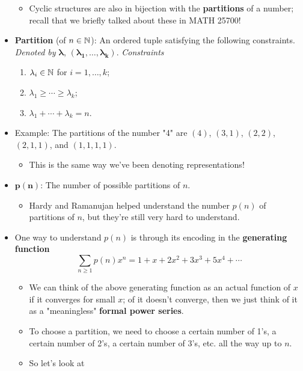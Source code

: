 \documentclass[../notes.tex]{subfiles}
\begin{document}
\begin{itemize}
\begin{itemize}
        \item Cyclic structures are also in bijection with the \textbf{partitions} of a number; recall that we briefly talked about these in MATH 25700!
    \end{itemize}
    \item \textbf{Partition} (of $n\in\mathbb{N}$): An ordered tuple satisfying the following constraints. \emph{Denoted by} $\bm{\lambda}$, $\bm{(\lambda_1,\ldots,\lambda_k)}$. \emph{Constraints}
    \begin{enumerate}
        \item $\lambda_i\in\mathbb{N}$ for $i=1,\dots,k$;
        \item $\lambda_1\geq\cdots\geq\lambda_k$;
        \item $\lambda_1+\cdots+\lambda_k=n$.
    \end{enumerate}
    \item Example: The partitions of the number "4" are $(4)$, $(3,1)$, $(2,2)$, $(2,1,1)$, and $(1,1,1,1)$.
    \begin{itemize}
        \item This is the same way we've been denoting representations!
    \end{itemize}
    \item $\bm{p(n)}$: The number of possible partitions of $n$.
    \begin{itemize}
        \item Hardy and Ramanujan helped understand the number $p(n)$ of partitions of $n$, but they're still very hard to understand.
    \end{itemize}
    \item One way to understand $p(n)$ is through its encoding in the \textbf{generating function}
    \begin{equation*}
        \sum_{n\geq 1}p(n)x^n = 1+x+2x^2+3x^3+5x^4+\cdots
    \end{equation*}
    \begin{itemize}
        \item We can think of the above generating function as an actual function of $x$ if it converges for small $x$; of it doesn't converge, then we just think of it as a "meaningless" \textbf{formal power series}.
        \item To choose a partition, we need to choose a certain number of 1's, a certain number of 2's, a certain number of 3's, etc. all the way up to $n$.
        \item So let's look at
        \begin{equation*}

\end{equation*}
\end{itemize}
\end{itemize}
\end{document}
